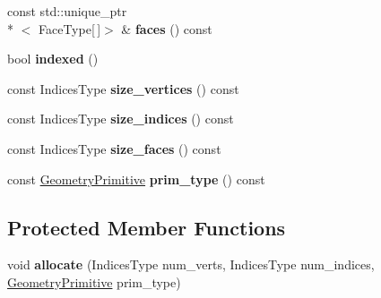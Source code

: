 \begin{DoxyCompactItemize}
\item 
\hypertarget{classs9_1_1GeometryT_af49b1eb83498b23afa8fe211f8af3609}{const std\-::unique\-\_\-ptr\\*
$<$ Face\-Type\mbox{[}$\,$\mbox{]}$>$ \& {\bfseries faces} () const }\label{classs9_1_1GeometryT_af49b1eb83498b23afa8fe211f8af3609}

\item 
\hypertarget{classs9_1_1GeometryT_a63255c1b8248a1ce1e3aad9b924d90b6}{bool {\bfseries indexed} ()}\label{classs9_1_1GeometryT_a63255c1b8248a1ce1e3aad9b924d90b6}

\item 
\hypertarget{classs9_1_1GeometryT_a4affed4db41968df07e30005bce6b754}{const Indices\-Type {\bfseries size\-\_\-vertices} () const }\label{classs9_1_1GeometryT_a4affed4db41968df07e30005bce6b754}

\item 
\hypertarget{classs9_1_1GeometryT_a77c3429162e8fd19e30f098c0d8e3c1f}{const Indices\-Type {\bfseries size\-\_\-indices} () const }\label{classs9_1_1GeometryT_a77c3429162e8fd19e30f098c0d8e3c1f}

\item 
\hypertarget{classs9_1_1GeometryT_aaccec9d5e613235e7254f72d76aca63a}{const Indices\-Type {\bfseries size\-\_\-faces} () const }\label{classs9_1_1GeometryT_aaccec9d5e613235e7254f72d76aca63a}

\item 
\hypertarget{classs9_1_1GeometryT_afd32dac6b5dc6174153ef7c7adc6580c}{const \hyperlink{namespaces9_ad57d1332f8fd67d23f6a1d3520ab785c}{Geometry\-Primitive} {\bfseries prim\-\_\-type} () const }\label{classs9_1_1GeometryT_afd32dac6b5dc6174153ef7c7adc6580c}

\end{DoxyCompactItemize}
\subsection*{Protected Member Functions}
\begin{DoxyCompactItemize}
\item 
\hypertarget{classs9_1_1GeometryT_a832204ccd5846aaecfc1f6bb6df1d8a9}{void {\bfseries allocate} (Indices\-Type num\-\_\-verts, Indices\-Type num\-\_\-indices, \hyperlink{namespaces9_ad57d1332f8fd67d23f6a1d3520ab785c}{Geometry\-Primitive} prim\-\_\-type)}\label{classs9_1_1GeometryT_a832204ccd5846aaecfc1f6bb6df1d8a9}

\end{DoxyCompactItemize}
